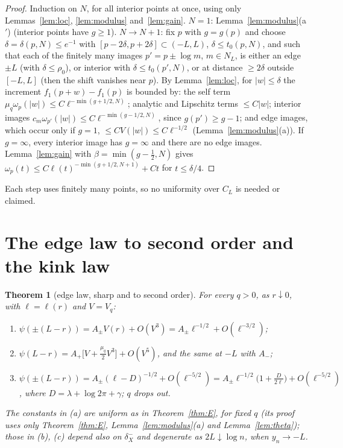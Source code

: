 \documentclass[11pt]{amsart}
\newtheorem{theorem}{Theorem}[section]
\theoremstyle{definition}
\theoremstyle{remark}
\numberwithin{equation}{section}
\begin{document}
\begin{proof}
Induction on $N$, for all interior points at once, using only Lemmas~\ref{lem:loc}, \ref{lem:modulus} and~\ref{lem:gain}. $N=1$: Lemma~\ref{lem:modulus}(a$'$) (interior points have $g\ge1$). $N\to N+1$: fix $p$ with $g=g(p)$ and choose $\delta=\delta(p,N)\le e^{-1}$ with $[p-2\delta,p+2\delta]\subset(-L,L)$, $\delta\le t_0(p,N)$, and such that each of the finitely many images $p'=p\pm\log m$, $m\in N_L$, is either an edge $\pm L$ (with $\delta\le\rho_0$), or interior with $\delta\le t_0(p',N)$, or at distance $\ge2\delta$ outside $[-L,L]$ (then the shift vanishes near $p$). By Lemma~\ref{lem:loc}, for $|w|\le\delta$ the increment $f_1(p+w)-f_1(p)$ is bounded by: the self term $\mu_q\omega_p(|w|)\le C\ell^{-\min(g+1/2,N)}$; analytic and Lipschitz terms $\le C|w|$; interior images $c_m\omega_{p'}(|w|)\le C\ell^{-\min(g-1/2,N)}$, since $g(p')\ge g-1$; and edge images, which occur only if $g=1$, $\le CV(|w|)\le C\ell^{-1/2}$ (Lemma~\ref{lem:modulus}(a)). If $g=\infty$, every interior image has $g=\infty$ and there are no edge images. Lemma~\ref{lem:gain} with $\beta=\min(g-\frac12,N)$ gives $\omega_p(t)\le C\ell(t)^{-\min(g+1/2,N+1)}+Ct$ for $t\le\delta/4$.
\end{proof}

Each step uses finitely many points, so no uniformity over $C_L$ is needed or claimed.

\section{The edge law to second order and the kink law}\label{sec:kink}

\begin{theorem}[edge law, sharp and to second order]\label{thm:K1}
For every $q>0$, as $r\downarrow0$, with $\ell=\ell(r)$ and $V=V_q$:
\begin{enumerate}
\item[(a)] $\psi(\pm(L-r))=A_\pm V(r)+O(V^3)=A_\pm\ell^{-1/2}+O(\ell^{-3/2})$;
\item[(b)] $\psi(L-r)=A_+\bigl[V+\frac{\mu_q}2V^3\bigr]+O(V^5)$, and the same at $-L$ with $A_-$;
\item[(c)] $\psi(\pm(L-r))=A_\pm(\ell-D)^{-1/2}+O(\ell^{-5/2})=A_\pm\ell^{-1/2}\bigl(1+\frac D{2\ell}\bigr)+O(\ell^{-5/2})$, where $D=\lambda+\log2\pi+\gamma$; $q$ drops out.
\end{enumerate}
The constants in (a) are uniform as in Theorem~\ref{thm:E}, for fixed $q$ (its proof uses only Theorem~\ref{thm:E}, Lemma~\ref{lem:modulus}(a) and Lemma~\ref{lem:theta}); those in (b), (c) depend also on $\delta^-_X$ and degenerate as $2L\downarrow\log n$, when $y_n\to-L$.
\end{theorem}
\end{document}
